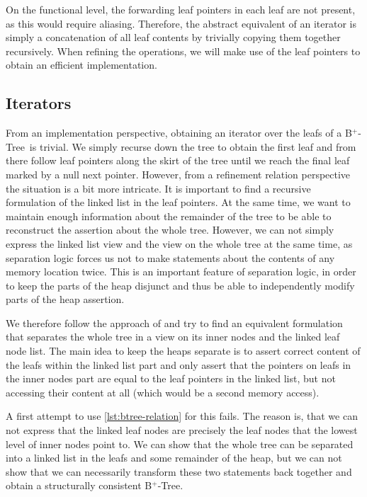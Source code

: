 \documentclass[a4paper,UKenglish,cleveref, autoref, thm-restate]{lipics-v2021}
\newcommand{\btree}{B$^+$-Tree}
\begin{document}
On the functional level, the forwarding leaf pointers in each leaf
are not present, as this would require aliasing.
Therefore, the abstract equivalent of an iterator
is simply a concatenation of all leaf contents by
trivially copying them together recursively.
When refining the operations, we will make use of the leaf pointers
to obtain an efficient implementation.

\subsection{Iterators}
\label{sec:imperative_iter}

From an implementation perspective, obtaining an iterator over the leafs
of a \btree\ is trivial.
We simply recurse down the tree to obtain the first leaf and from there follow leaf
pointers along the skirt of the tree until we reach the final leaf marked by a null next pointer.
However, from a refinement relation perspective the situation is a bit more intricate.
It is important to find a recursive formulation of the linked list in the leaf pointers.
At the same time, we want to maintain enough information about the remainder of the tree
to be able to reconstruct the assertion about the whole tree.
However, we can not simply express the linked list view and the view on the
whole tree at the same time,
as separation logic forces us not to make statements about the contents of
any memory location twice.
This is an important feature of separation logic,
in order to keep the parts of the heap disjunct and
thus be able to independently modify parts of the heap assertion.

We therefore follow the approach of \cite{DBLP:conf/popl/MalechaMSW10} and
try to find an equivalent formulation that separates the whole tree in a
view on its inner nodes and the linked leaf node list.
The main idea to keep the heaps separate is to
assert correct content of the leafs within the linked list part
and only assert that the pointers on leafs in the inner nodes part
are equal to the leaf pointers in the linked list, but not accessing
their content at all (which would be a second memory access).

A first attempt to use \autoref{lst:btree-relation} for this fails.
The reason is, that we can not express that the linked leaf nodes
are precisely the leaf nodes that the lowest level of inner nodes point to.
We can show that the whole tree can be separated into a linked list in the leafs
and some remainder of the heap, but we can not show that we can necessarily transform
these two statements back together and obtain a structurally consistent \btree.
\end{document}
